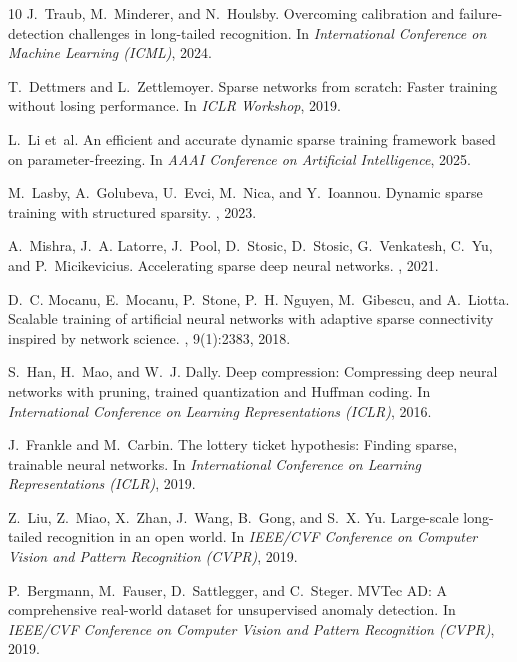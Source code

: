 \documentclass[letterpaper]{article} %
\begin{document}
\begin{thebibliography}{10}
J.~Traub, M.~Minderer, and N.~Houlsby.
\newblock Overcoming calibration and failure-detection challenges in long-tailed recognition.
\newblock In {\em International Conference on Machine Learning (ICML)}, 2024.

T.~Dettmers and L.~Zettlemoyer.
\newblock Sparse networks from scratch: Faster training without losing performance.
\newblock In {\em ICLR Workshop}, 2019.

L.~Li et~al.
\newblock An efficient and accurate dynamic sparse training framework based on parameter-freezing.
\newblock In {\em AAAI Conference on Artificial Intelligence}, 2025.

M.~Lasby, A.~Golubeva, U.~Evci, M.~Nica, and Y.~Ioannou.
\newblock Dynamic sparse training with structured sparsity.
, 2023.

A.~Mishra, J.~A. Latorre, J.~Pool, D.~Stosic, D.~Stosic, G.~Venkatesh, C.~Yu, and P.~Micikevicius.
\newblock Accelerating sparse deep neural networks.
, 2021.

D.~C. Mocanu, E.~Mocanu, P.~Stone, P.~H. Nguyen, M.~Gibescu, and A.~Liotta.
\newblock Scalable training of artificial neural networks with adaptive sparse connectivity inspired by network science.
, 9(1):2383, 2018.

S.~Han, H.~Mao, and W.~J. Dally.
\newblock Deep compression: Compressing deep neural networks with pruning, trained quantization and Huffman coding.
\newblock In {\em International Conference on Learning Representations (ICLR)}, 2016.

J.~Frankle and M.~Carbin.
\newblock The lottery ticket hypothesis: Finding sparse, trainable neural networks.
\newblock In {\em International Conference on Learning Representations (ICLR)}, 2019.

Z.~Liu, Z.~Miao, X.~Zhan, J.~Wang, B.~Gong, and S.~X. Yu.
\newblock Large-scale long-tailed recognition in an open world.
\newblock In {\em IEEE/CVF Conference on Computer Vision and Pattern Recognition (CVPR)}, 2019.

P.~Bergmann, M.~Fauser, D.~Sattlegger, and C.~Steger.
\newblock MVTec AD: A comprehensive real-world dataset for unsupervised anomaly detection.
\newblock In {\em IEEE/CVF Conference on Computer Vision and Pattern Recognition (CVPR)}, 2019.


\end{thebibliography}
\end{document}
